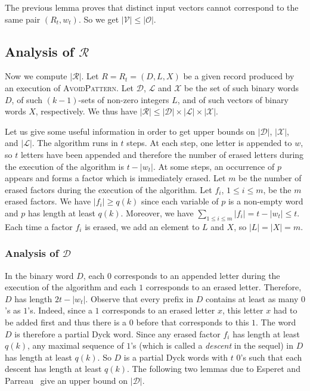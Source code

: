 \documentclass[]{elsart}
\newcommand{\ap}{\textsc{AvoidPattern}\xspace}
\begin{document}
The previous lemma proves that distinct input vectors cannot
correspond to the same pair $(R_t,w_t)$. So we get $|\mathcal{V}|\le
|\mathscr{O}|$.

\subsection{Analysis of $\mathcal{R}$}

Now we compute $|\mathcal{R}|$. Let $R=R_t=(D,L,X)$ be a given record
produced by an execution of \ap. Let $\mathcal{D}$, $\mathcal{L}$ and
$\mathcal{X}$ be the set of such binary words $D$, of such
$(k-1)$-sets of non-zero integers $L$, and of such vectors of binary
words $X$, respectively. We thus have $|\mathcal{R}|\le
|\mathcal{D}|\times|\mathcal{L}|\times|\mathcal{X}|$.

Let us give some useful information in order to get upper bounds on
$|\mathcal{D}|$, $|\mathcal{X}|$, and $|\mathcal{L}|$. The algorithm
runs in $t$ steps.  At each step, one letter is appended to $w$, so
$t$ letters have been appended and therefore the number of erased
letters during the execution of the algorithm is $t-|w_t|$. At some
steps, an occurrence of $p$ appears and forms a factor which is
immediately erased. Let $m$ be the number of erased factors during the
execution of the algorithm.  Let $f_i$, $1\le i\le m$, be the $m$
erased factors.  We have $|f_i|\ge q(k)$ since each variable of $p$ is
a non-empty word and $p$ has length at least $q(k)$. Moreover, we have
$\sum_{1\le i\le m}|f_i| =t-|w_t|\le t$.  Each time a factor $f_i$ is
erased, we add an element to $L$ and $X$, so $|L|=|X|=m$.

\subsubsection{Analysis of $\mathcal{D}$}

In the binary word $D$, each $0$ corresponds to an
appended letter during the execution of the algorithm and each $1$
corresponds to an erased letter. Therefore, $D$ has length $2t-|w_t|$.
Observe that every prefix in $D$ contains at least as many $0$'s as $1$'s.
Indeed, since a $1$ corresponds to an erased letter $x$, this
letter $x$ had to be added first and thus there is a $0$ before that
corresponds to this $1$. The word $D$ is therefore a partial Dyck word.
Since any erased factor $f_i$ has length at least $q(k)$, any
maximal sequence of $1$'s (which is called a \emph{descent} in the
sequel) in $D$ has length at least $q(k)$. So $D$ is a partial Dyck
words with $t$ $0$'s such that each descent has length at least $q(k)$.
The following two lemmas due to Esperet and Parreau~\cite{Esperet:2012}
give an upper bound on $|\mathcal{D}|$.
\end{document}
